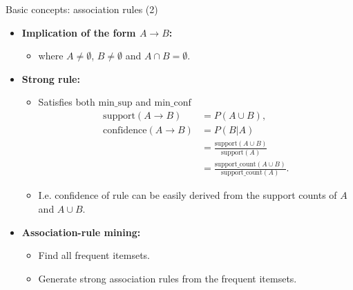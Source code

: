 \documentclass[aspectratio=169,t,xcolor=dvipsnames]{beamer}
\begin{document}
  {
    \begin{frame}{Basic concepts: association rules (2)}
    \begin{itemize}
      \item \textbf{Implication of the form $A \rightarrow B$:}
      \begin{itemize}
        \item where $A \neq \emptyset$, $B \neq \emptyset$ and $A \cap B = \emptyset$.
      \end{itemize}
      \item \textbf{Strong rule:}
      \begin{itemize}
        \item Satisfies both $\text{min\_sup}$ and $\text{min\_conf}$
        \begin{align}
        \text{support}(A \rightarrow B) &= P(A \cup B),\\
        \text{confidence}(A \rightarrow B) &= P(B | A)\\
        &= \frac{\text{support}(A \cup B)}{\text{support}(A)}\\
        &= \frac{\text{support\_count}(A\cup B)}{\text{support\_count}(A)}.
        \end{align}
        \item I.e. confidence of rule can be easily derived from the support counts of $A$ and $A \cup B$.
      \end{itemize}
      \item \textbf{Association-rule mining:}
      \begin{itemize}
        \item Find all frequent itemsets.
        \item Generate strong association rules from the frequent itemsets.
      \end{itemize}
    \end{itemize}
    \end{frame}
  }
\end{document}
